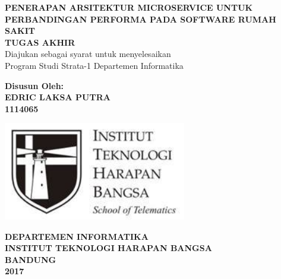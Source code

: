 \begin{titlepage}
\begin{center}
	\onehalfspacing
	{\large \bfseries PENERAPAN ARSITEKTUR MICROSERVICE UNTUK PERBANDINGAN PERFORMA PADA SOFTWARE RUMAH SAKIT\\
	\vspace{1.5cm}
	 \large TUGAS AKHIR}\\
           Diajukan sebagai syarat untuk menyelesaikan\\ Program Studi Strata-1 Departemen Informatika

	\vspace{1.5cm}
          {\bfseries Disusun Oleh: \\
           EDRIC LAKSA PUTRA \\
	1114065}
	
	\vspace{1.5cm}
	\includegraphics[width=8cm]{images/ithb.jpg}
	
	
	\vspace{3.5cm}
	
{\large \bfseries DEPARTEMEN INFORMATIKA \\
INSTITUT TEKNOLOGI HARAPAN BANGSA \\
BANDUNG\\
2017}

	
\end{center}

\end{titlepage}

\newpage